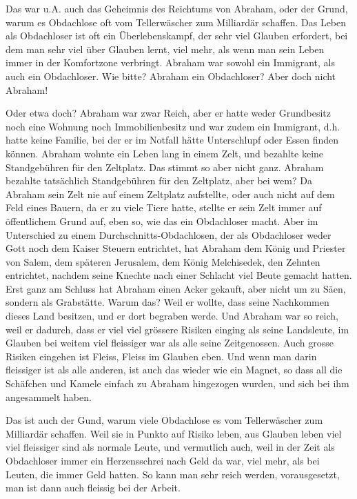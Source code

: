 \documentclass[
]{article}
\begin{document}
Das war u.A. auch das Geheimnis des Reichtums von Abraham, oder der
Grund, warum es Obdachlose oft vom Tellerwäscher zum Milliardär
schaffen. Das Leben als Obdachloser ist oft ein Überlebenskampf, der
sehr viel Glauben erfordert, bei dem man sehr viel über Glauben lernt,
viel mehr, als wenn man sein Leben immer in der Komfortzone verbringt.
Abraham war sowohl ein Immigrant, als auch ein Obdachloser. Wie bitte?
Abraham ein Obdachloser? Aber doch nicht Abraham!

Oder etwa doch? Abraham war zwar Reich, aber er hatte weder Grundbesitz
noch eine Wohnung noch Immobilienbesitz und war zudem ein Immigrant,
d.h. hatte keine Familie, bei der er im Notfall hätte Unterschlupf oder
Essen finden können. Abraham wohnte ein Leben lang in einem Zelt, und
bezahlte keine Standgebühren für den Zeltplatz. Das stimmt so aber nicht
ganz. Abraham bezahlte tatsächlich Standgebühren für den Zeltplatz, aber
bei wem? Da Abraham sein Zelt nie auf einem Zeltplatz aufstellte, oder
auch nicht auf dem Feld eines Bauern, da er zu viele Tiere hatte,
stellte er sein Zelt immer auf öffentlichem Grund auf, eben so, wie das
ein Obdachloser macht. Aber im Unterschied zu einem
Durchschnitts-Obdachlosen, der als Obdachloser weder Gott noch dem
Kaiser Steuern entrichtet, hat Abraham dem König und Priester von Salem,
dem späteren Jerusalem, dem König Melchisedek, den Zehnten entrichtet,
nachdem seine Knechte nach einer Schlacht viel Beute gemacht hatten.
Erst ganz am Schluss hat Abraham einen Acker gekauft, aber nicht um zu
Säen, sondern als Grabstätte. Warum das? Weil er wollte, dass seine
Nachkommen dieses Land besitzen, und er dort begraben werde. Und Abraham
war so reich, weil er dadurch, dass er viel viel grössere Risiken
einging als seine Landsleute, im Glauben bei weitem viel fleissiger war
als alle seine Zeitgenossen. Auch grosse Risiken eingehen ist Fleiss,
Fleiss im Glauben eben. Und wenn man darin fleissiger ist als alle
anderen, ist auch das wieder wie ein Magnet, so dass all die Schäfchen
und Kamele einfach zu Abraham hingezogen wurden, und sich bei ihm
angesammelt haben.

Das ist auch der Gund, warum viele Obdachlose es vom Tellerwäscher zum
Milliardär schaffen. Weil sie in Punkto auf Risiko leben, aus Glauben
leben viel viel fleissiger sind als normale Leute, und vermutlich auch,
weil in der Zeit als Obdachloser immer ein Herzensschrei nach Geld da
war, viel mehr, als bei Leuten, die immer Geld hatten. So kann man sehr
reich werden, vorausgesetzt, man ist dann auch fleissig bei der Arbeit.
\end{document}
